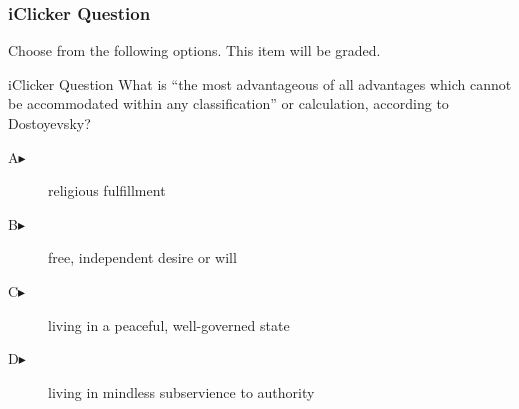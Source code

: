 \begin{frame}
  \frametitle{iClicker Question}
Choose from the following options. This item will be graded.
\begin{block}{iClicker Question}
What is ``the most advantageous of all advantages which cannot be
accommodated within any classification'' or calculation, according to Dostoyevsky?
\end{block}
\begin{description}
\item[A\hspace{.2in}$\blacktriangleright$] religious fulfillment
\item[B\hspace{.2in}$\blacktriangleright$] free, independent desire or will
\item[C\hspace{.2in}$\blacktriangleright$] living in a peaceful, well-governed state
\item[D\hspace{.2in}$\blacktriangleright$] living in mindless subservience to authority
\end{description}
\end{frame}

